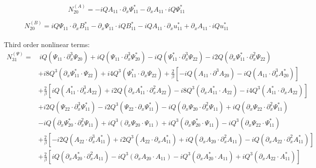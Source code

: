\documentclass{emulateapj}
\newcommand{\beq}{\begin{equation}}
\newcommand{\eeq}{\end{equation}}
\begin{document}
\begin{appendices}
\begin{widetext}
\beq
N_{20}^{(A)} = - i Q A_{11} \cdot \partial_x \Psi_{11}^* - \partial_x A_{11} \cdot i Q \Psi_{11}^*
\eeq

\beq
N_{20}^{(B)} = i Q \Psi_{11} \cdot \partial_x B_{11}^* - \partial_x \Psi_{11} \cdot i Q B_{11}^* - i Q A_{11} \cdot \partial_x u_{11}^* + \partial_x A_{11} \cdot i Q u_{11}^*
\eeq \\

Third order nonlinear terms: \\

\beq
\begin{split}
N_{31}^{(\Psi)} = &  \, i Q \left(\Psi_{11} \cdot \partial_x^3 \Psi_{20}\right) + i Q \left(\Psi_{11} \cdot \partial_x^3\Psi_{20}^*\right) - i Q \left(\Psi_{11}^* \cdot \partial_x^3 \Psi_{22}\right) - i 2 Q \left(\partial_x \Psi_{11}^* \cdot \partial_x^2 \Psi_{22}\right) \\
& + i 8 Q^3 \left(\partial_x\Psi_{11}^* \cdot \Psi_{22}\right) + i 4 Q^3 \left(\Psi_{11}^* \cdot \partial_x \Psi_{22}\right) + \frac{2}{\beta}\left[ - i Q \left(A_{11} \cdot \partial^3 A_{20}\right) - i Q \left(A_{11} \cdot \partial_x^3 A_{20}^*\right) \right]\\
& + \frac{2}{\beta}\left[i Q \left(A_{11}^* \cdot \partial_x^3 A_{22}\right) + i 2 Q \left(\partial_x A_{11}^* \cdot \partial_x^2 A_{22}\right) - i 8 Q^3 \left(\partial_x A_{11}^* \cdot A_{22}\right) - i 4 Q^3 \left(A_{11}^* \cdot \partial_x A_{22}\right)\right] \\
& + i 2 Q \left(\Psi_{22} \cdot \partial_x^3 \Psi_{11}^*\right) - i 2 Q^3\left(\Psi_{22} \cdot \partial_x \Psi_{11}^* \right) - i Q \left(\partial_x \Psi_{20} \cdot \partial_x^2 \Psi_{11}\right) + i Q \left(\partial_x \Psi_{22} \cdot \partial_x^2 \Psi_{11}^*\right) \\
& - i Q \left(\partial_x \Psi_{20}^* \cdot \partial_x^2 \Psi_{11}\right) + i Q^3 \left(\partial_x \Psi_{20} \cdot \Psi_{11}\right) + i Q^3 \left(\partial_x \Psi_{20}^* \cdot \Psi_{11}\right) - i Q^3 \left(\partial_x \Psi_{22} \cdot \Psi_{11}^*\right) \\
& + \frac{2}{\beta} \left[ - i 2 Q \left(A_{22} \cdot \partial_x^3 A_{11}^*\right) + i 2 Q^3 \left(A_{22} \cdot \partial_x A_{11}^*\right) + i Q \left(\partial_x A_{20} \cdot \partial_x^2 A_{11}\right) - i Q \left(\partial_x A_{22} \cdot \partial_x^2 A_{11}^*\right) \right] \\
& + \frac{2}{\beta} \left[ i Q \left(\partial_x A_{20}^* \cdot \partial_x^2 A_{11}\right) - i Q^3 \left(\partial_x A_{20} \cdot A_{11}\right) - i Q^3 \left(\partial_x A_{20}^* \cdot A_{11}\right) + i Q^3 \left(\partial_x A_{22} \cdot A_{11}^*\right)\right]
\end{split}
\eeq


\end{widetext}
\end{appendices}
\end{document}
